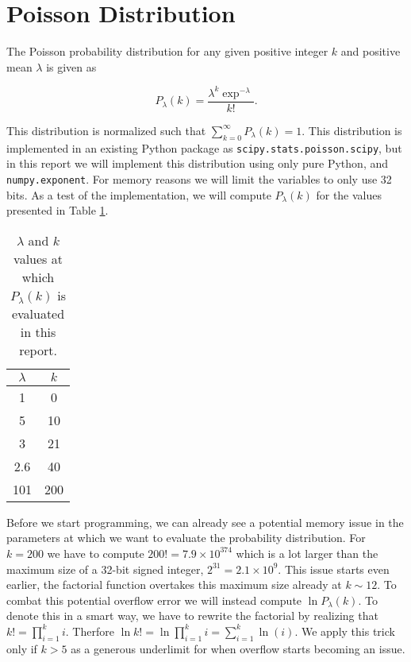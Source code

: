 \section{Poisson Distribution}


The Poisson probability distribution for any given positive integer $k$ and positive mean $\lambda$ is given as

\begin{equation}
    P_{\lambda}(k) = \frac{\lambda^{k}\exp^{-\lambda}}{k!}.
\end{equation}

This distribution is normalized such that $\sum_{k=0}^{\infty} P_{\lambda}(k) = 1$. This distribution is implemented in an existing Python package as \texttt{scipy.stats.poisson.scipy}, but in this report we will implement this distribution using only pure Python, and \texttt{numpy.exponent}. For memory reasons we will limit the variables to only use 32 bits. As a test of the implementation, we will compute $P_{\lambda}(k)$ for the values presented in Table \ref{tab:poisson_vals}. 

\begin{table}[h]
    \centering
    \begin{tabular}{c|c}
    \hline
    $\lambda$ & $k$ \\
    \hline
        1 & 0 \\
        5 & 10 \\
        3 & 21 \\        
        2.6 & 40 \\
        101 & 200 \\
    \end{tabular}
    \caption{$\lambda$ and $k$ values at which $P_{\lambda}(k)$ is evaluated in this report.}
    \label{tab:poisson_vals}
\end{table}

Before we start programming, we can already see a potential memory issue in the parameters at which we want to evaluate the probability distribution. For $k = 200$ we have to compute $200! = 7.9 \times 10^{374}$ which is a lot larger than the maximum size of a 32-bit signed integer, $2^{31} = 2.1 \times 10^{9}$. This issue starts even earlier, the factorial function overtakes this maximum size already at $k \sim 12$. To combat this potential overflow error we will instead compute $\ln P_{\lambda}(k)$. To denote this in a smart way, we have to rewrite the factorial by realizing that $k! = \prod_{i=1}^k i$. Therfore $\ln k! = \ln \prod_{i=1}^k i = \sum_{i=1}^{k} \ln(i)$. We apply this trick only if $k > 5$ as a generous underlimit for when overflow starts becoming an issue.

